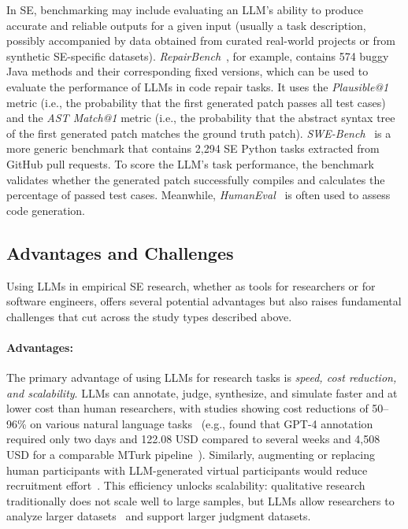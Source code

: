 \documentclass[smallextended]{svjour3}
\newcommand{\studytypeparagraph}[1]{\paragraph{\bfseries #1:}}
\newcommand{\studytypeparagraph}[1]{\subsubsection{#1}}
\begin{document}
In SE, benchmarking may include evaluating an LLM's ability to produce accurate and reliable outputs for a given input (usually a task description, possibly accompanied by data obtained from curated real-world projects or from synthetic SE-specific datasets). \emph{RepairBench}~\cite{DBLP:conf/llm4code/SilvaM25}, for example, contains 574 buggy Java methods and their corresponding fixed versions, which can be used to evaluate the performance of LLMs in code repair tasks. It uses the \emph{Plausible@1} metric (i.e., the probability that the first generated patch passes all test cases) and the \emph{AST Match@1} metric (i.e., the probability that the abstract syntax tree of the first generated patch matches the ground truth patch).
\emph{SWE-Bench}~\cite{DBLP:conf/iclr/JimenezYWYPPN24} is a more generic benchmark that contains 2,294 SE Python tasks extracted from GitHub pull requests.
To score the LLM's task performance, the benchmark validates whether the generated patch successfully compiles and calculates the percentage of passed test cases. Meanwhile, \emph{HumanEval}~\cite{DBLP:journals/corr/abs-2107-03374} is often used to assess code generation. 
 
\subsection{Advantages and Challenges}
\label{sec:advantages-challenges}

Using LLMs in empirical SE research, whether as tools for researchers or for software engineers, offers several potential advantages but also raises fundamental challenges that cut across the study types described above.

\studytypeparagraph{Advantages}

The primary advantage of using LLMs for research tasks is \emph{speed, cost reduction, and scalability}. LLMs can annotate, judge, synthesize, and simulate faster and at lower cost than human researchers, with studies showing cost reductions of 50--96\% on various natural language tasks~\cite{DBLP:conf/emnlp/WangLXZZ21} (e.g., \citeauthor{DBLP:conf/chi/HeHDRH24} found that GPT-4 annotation required only two days and 122.08 USD compared to several weeks and 4,508 USD for a comparable MTurk pipeline~\cite{DBLP:conf/chi/HeHDRH24}). Similarly, augmenting or replacing human participants with LLM-generated virtual participants would reduce recruitment effort~\cite{DBLP:conf/vl/Madampe0HO24}. This efficiency unlocks scalability: qualitative research traditionally does not scale well to large samples, but LLMs allow researchers to analyze larger datasets~\cite{DBLP:journals/ase/BanoHZT24, DBLP:conf/wsese/BarrosANKKNB25, DBLP:conf/wsese/LecaVSS25} and support larger judgment datasets.
\end{document}
